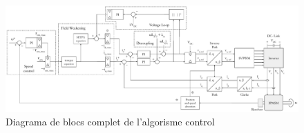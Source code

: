 {{        \begin{figure}[!htb]
            \centering
            \captionsetup{justification=centering, margin=1cm}
            \includegraphics[width=15.75cm]
                { img/3_control_motor/control.pdf }
            \caption[Diagrama de blocs del control]
                { Diagrama de blocs complet de l'algorisme control }
            \label{diagrama}
        \end{figure}
    }
}